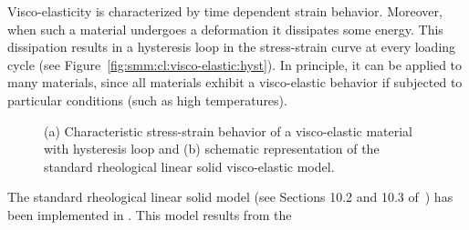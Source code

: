 Visco-elasticity is characterized by time dependent strain behavior. Moreover,
when such a material undergoes a deformation it dissipates some energy. This
dissipation results in a hysteresis loop in the stress-strain curve at every
loading cycle (see Figure~\ref{fig:smm:cl:visco-elastic:hyst}). In principle, it
can be applied to many materials, since all materials exhibit a visco-elastic
behavior if subjected to particular conditions (such as high temperatures).
\begin{figure}[!htb]
  \begin{center}

    \hspace{0.05\textwidth}
    \caption{(a) Characteristic stress-strain behavior of a visco-elastic material with hysteresis loop and (b) schematic representation of the standard rheological linear solid visco-elastic model.}
    \label{fig:smm:cl:visco-elastic}
  \end{center}
\end{figure}
The standard rheological linear solid model (see Sections 10.2 and 10.3
of~\cite{simo92}) has been implemented in \akantu. This model results from the
